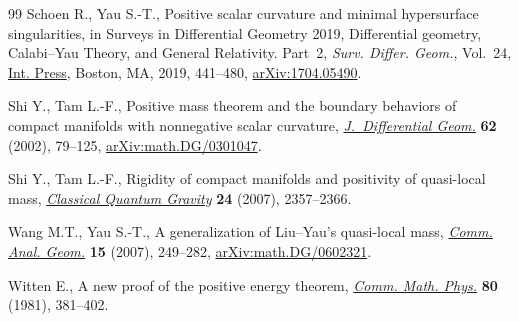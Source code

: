 \begin{thebibliography}{99}
Schoen R., Yau S.-T., Positive scalar curvature and minimal hypersurface
 singularities, in Surveys in Differential Geometry 2019, {D}ifferential
 geometry, {C}alabi--{Y}au Theory, and General Relativity. {P}art~2,
 \textit{Surv. Differ. Geom.}, Vol.~24, \href{https://dx.doi.org/10.4310/SDG.2019.v24.n1.a10}{Int. Press}, Boston, MA, 2019,
 441--480, \href{https://arxiv.org/abs/1704.05490}{arXiv:1704.05490}.

Shi Y., Tam L.-F., Positive mass theorem and the boundary behaviors of compact
 manifolds with nonnegative scalar curvature, \href{https://doi.org/10.4310/jdg/1090425530}{\textit{J.~Differential Geom.}}
 \textbf{62} (2002), 79--125, \href{https://arxiv.org/abs/math.DG/0301047}{arXiv:math.DG/0301047}.

Shi Y., Tam L.-F., Rigidity of compact manifolds and positivity of quasi-local
 mass, \href{https://doi.org/10.1088/0264-9381/24/9/013}{\textit{Classical Quantum Gravity}} \textbf{24} (2007), 2357--2366.

Wang M.T., Yau S.-T., A generalization of {L}iu--{Y}au's quasi-local mass,
 \href{https://dx.doi.org/10.4310/CAG.2007.v15.n2.a2}{\textit{Comm. Anal. Geom.}} \textbf{15} (2007), 249--282,
 \href{https://arxiv.org/abs/math.DG/0602321}{arXiv:math.DG/0602321}.

Witten E., A new proof of the positive energy theorem, \href{https://doi.org/10.1007/BF01208277}{\textit{Comm. Math.
 Phys.}} \textbf{80} (1981), 381--402.

\end{thebibliography}
